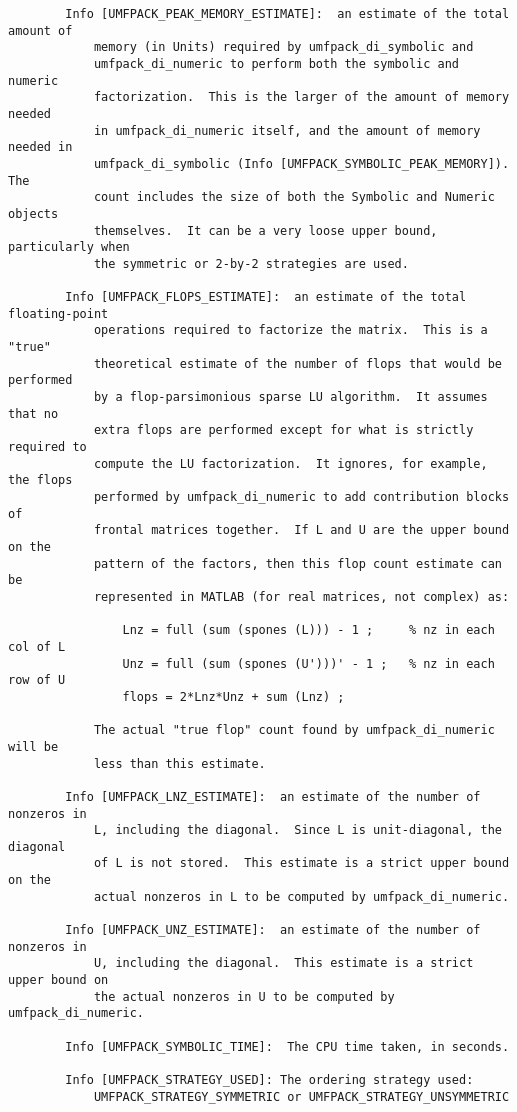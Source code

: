 \documentclass[11pt]{article}
\begin{document}
{\begin{verbatim}
        Info [UMFPACK_PEAK_MEMORY_ESTIMATE]:  an estimate of the total amount of
            memory (in Units) required by umfpack_di_symbolic and
            umfpack_di_numeric to perform both the symbolic and numeric
            factorization.  This is the larger of the amount of memory needed
            in umfpack_di_numeric itself, and the amount of memory needed in
            umfpack_di_symbolic (Info [UMFPACK_SYMBOLIC_PEAK_MEMORY]).  The
            count includes the size of both the Symbolic and Numeric objects
            themselves.  It can be a very loose upper bound, particularly when
            the symmetric or 2-by-2 strategies are used.

        Info [UMFPACK_FLOPS_ESTIMATE]:  an estimate of the total floating-point
            operations required to factorize the matrix.  This is a "true"
            theoretical estimate of the number of flops that would be performed
            by a flop-parsimonious sparse LU algorithm.  It assumes that no
            extra flops are performed except for what is strictly required to
            compute the LU factorization.  It ignores, for example, the flops
            performed by umfpack_di_numeric to add contribution blocks of
            frontal matrices together.  If L and U are the upper bound on the
            pattern of the factors, then this flop count estimate can be
            represented in MATLAB (for real matrices, not complex) as:

                Lnz = full (sum (spones (L))) - 1 ;     % nz in each col of L
                Unz = full (sum (spones (U')))' - 1 ;   % nz in each row of U
                flops = 2*Lnz*Unz + sum (Lnz) ;

            The actual "true flop" count found by umfpack_di_numeric will be
            less than this estimate.

        Info [UMFPACK_LNZ_ESTIMATE]:  an estimate of the number of nonzeros in
            L, including the diagonal.  Since L is unit-diagonal, the diagonal
            of L is not stored.  This estimate is a strict upper bound on the
            actual nonzeros in L to be computed by umfpack_di_numeric.

        Info [UMFPACK_UNZ_ESTIMATE]:  an estimate of the number of nonzeros in
            U, including the diagonal.  This estimate is a strict upper bound on
            the actual nonzeros in U to be computed by umfpack_di_numeric.

        Info [UMFPACK_SYMBOLIC_TIME]:  The CPU time taken, in seconds.

        Info [UMFPACK_STRATEGY_USED]: The ordering strategy used:
            UMFPACK_STRATEGY_SYMMETRIC or UMFPACK_STRATEGY_UNSYMMETRIC
\end{verbatim}
}
\end{document}
